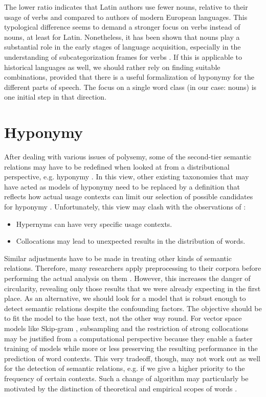 \documentclass[oneside]{book}
\begin{document}
The lower ratio indicates that Latin authors use fewer nouns, relative to their usage of verbs and compared to authors of modern European languages. This typological difference seems to demand a stronger focus on verbs instead of nouns, at least for Latin. Nonetheless, it has been shown that nouns play a substantial role in the early stages of language acquisition, especially in the understanding of subcategorization frames for verbs \parencite[1383]{yuanCountingNounsSimple2012}. If this is applicable to historical languages as well, we should rather rely on finding suitable combinations, provided that there is a useful formalization of hyponymy for the different parts of speech. The focus on a single word class (in our case: nouns) is one initial step in that direction.

\chapter{Hyponymy}
After dealing with various issues of polysemy, some of the second-tier semantic relations may have to be redefined when looked at from a distributional perspective, e.g. hyponymy \parencite[443]{herbelotMeasuringSemanticContent2013}. In this view, other existing taxonomies that may have acted as models of hyponymy need to be replaced by a definition that reflects how actual usage contexts can limit our selection of possible candidates for hyponymy \parencite[443]{rollerInclusiveSelectiveSupervised2014}. Unfortunately, this view may clash with the observations of \textcite{herbelotMeasuringSemanticContent2013}:
\begin{itemize}
      \item Hypernyms can have very specific usage contexts.
      \item Collocations may lead to unexpected results in the distribution of words.
\end{itemize}
Similar adjustments have to be made in treating other kinds of semantic relations. Therefore, many researchers apply preprocessing to their corpora before performing the actual analysis on them \parencite[56f.]{gyllenstenRgramsUnsupervisedLearning2019}. However, this increases the danger of circularity, revealing only those results that we were already expecting in the first place. As an alternative, we should look for a model that is robust enough to detect semantic relations despite the confounding factors. The objective should be to fit the model to the base text, not the other way round. For vector space models like Skip-gram \parencite[5]{mikolovEfficientEstimationWord2013}, subsampling and the restriction of strong collocations may be justified from a computational perspective because they enable a faster training of models while more or less preserving the resulting performance in the prediction of word contexts. This very tradeoff, though, may not work out as well for the detection of semantic relations, e.g. if we give a higher priority to the frequency of certain contexts. Such a change of algorithm may particularly be motivated by the distinction of theoretical and empirical scopes of words \parencite[46]{coenenAnalogieUndMetapher2013}. 
\end{document}
